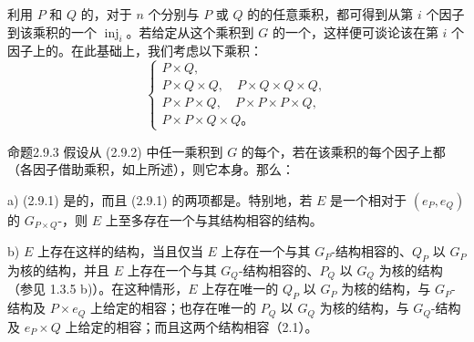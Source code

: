 利用 $P$ 和 $Q$ 的，对于 $n$ 个分别与 $P$ 或 $Q$ 的的任意乘积，都可得到从第 $i$ 个因子到该乘积的一个 $\operatorname{inj}_i$。若给定从这个乘积到 $G$ 的一个，这样便可谈论该在第 $i$ 个因子上的。在此基础上，我们考虑以下乘积：
\[
\left\{\begin{gathered}
P\times Q,\\
P\times Q\times Q,\quad P\times Q\times Q\times Q,\\
P\times P\times Q,\quad P\times P\times P\times Q,\\
P\times P\times Q\times Q。
\end{gathered}\right.
\tag{2.9.2}
\]
\begin{SGAresult}{命题}{2.9.3}
假设从 (2.9.2) 中任一乘积到 $G$ 的每个，若在该乘积的每个因子上都（各因子借助乘积，如上所述），则它本身。那么：

 a)  (2.9.1) 是的，而且 (2.9.1) 的两项都是。特别地，若 $E$ 是一个相对于 $(e_P,e_Q)$ 的 $G_{P\times Q}$-，则 $E$ 上至多存在一个与其结构相容的结构。

 b) $E$ 上存在这样的结构，当且仅当 $E$ 上存在一个与其 $G_P$-结构相容的、$Q_P$ 以 $G_P$ 为核的结构，并且 $E$ 上存在一个与其 $G_Q$-结构相容的、$P_Q$ 以 $G_Q$ 为核的结构（参见 1.3.5 b)）。在这种情形，$E$ 上存在唯一的 $Q_P$ 以 $G_P$ 为核的结构，与 $G_P$-结构及 $P\times e_Q$ 上给定的相容；也存在唯一的 $P_Q$ 以 $G_Q$ 为核的结构，与 $G_Q$-结构及 $e_P\times Q$ 上给定的相容；而且这两个结构相容（2.1）。
\end{SGAresult}
